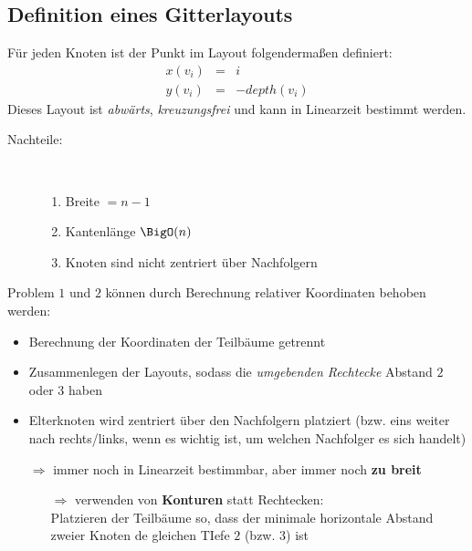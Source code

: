 \subsection{Definition eines Gitterlayouts}
Für jeden Knoten ist der Punkt im Layout folgendermaßen definiert:
\begin{eqnarray*}
	x(v_i)&= & i\\
	y(v_i)& = & -depth(v_i)
\end{eqnarray*}
Dieses Layout ist \textit{abwärts}, \textit{kreuzungsfrei} und kann in Linearzeit bestimmt werden.\\
\topbreak
\vspace*{-1.5\baselineskip}
\begin{description}
	\item[Nachteile:]\ \\\vspace*{-\baselineskip}
		\begin{enumerate}[itemsep=-1pt]
			\item Breite $=n-1$
			\item Kantenlänge $\BigO(n)$
			\item Knoten sind nicht zentriert über Nachfolgern
		\end{enumerate}
\end{description}
Problem $1$ und $2$ können durch Berechnung relativer Koordinaten behoben werden:
\begin{itemize}[itemsep=-1pt]
	\item Berechnung der Koordinaten der Teilbäume getrennt
	\item Zusammenlegen der Layouts, sodass die \textit{umgebenden Rechtecke} Abstand $2$ oder $3$ haben
	\item Elterknoten wird zentriert über den Nachfolgern platziert (bzw. eins weiter nach rechts/links, wenn es wichtig ist, um welchen Nachfolger es sich handelt)
	\item[$\Rightarrow$] immer noch in Linearzeit bestimmbar, aber immer noch \textbf{zu breit}
		\begin{itemize}[itemsep=-1pt]
			\item[$\Rightarrow$] verwenden von \textbf{Konturen} statt Rechtecken:\\
			Platzieren der Teilbäume so, dass der minimale horizontale Abstand zweier Knoten de gleichen TIefe $2$ (bzw. $3$) ist
		\end{itemize}
\end{itemize}
